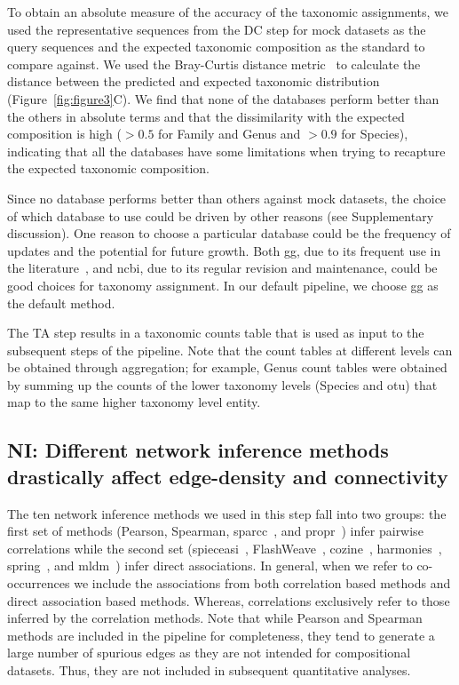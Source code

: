 \documentclass[letterpaper,12pt]{article}
\begin{document}
  To obtain an absolute measure of the accuracy of the taxonomic assignments, we used the representative sequences from the DC step for mock datasets as the query sequences and the expected taxonomic composition as the standard to compare against.
  We used the Bray-Curtis distance metric~\cite{virtanenSciPyFundamentalAlgorithms2020} to calculate the distance between the predicted and expected taxonomic distribution (Figure~\ref{fig:figure3}C).
  We find that none of the databases perform better than the others in absolute terms and that the dissimilarity with the expected composition is high ($>0.5$ for Family and Genus and $>0.9$ for Species), indicating that all the databases have some limitations when trying to recapture the expected taxonomic composition.

  Since no database performs better than others against mock datasets, the choice of which database to use could be driven by other reasons (see Supplementary discussion).
  One reason to choose a particular database could be the frequency of updates and the potential for future growth.
  Both \ac{gg}, due to its frequent use in the literature~\cite{Balvociute2017}, and \ac{ncbi}, due to its regular revision and maintenance, could be good choices for taxonomy assignment.
  In our default pipeline, we choose \ac{gg} as the default method.

  The TA step results in a taxonomic counts table that is used as input to the subsequent steps of the pipeline.
  Note that the count tables at different levels can be obtained through aggregation; for example, Genus count tables were obtained by summing up the counts of the lower taxonomy levels (Species and \ac{otu}) that map to the same higher taxonomy level entity.

  \FloatBarrier

  \subsection*{NI: Different network inference methods drastically affect edge-density and connectivity}

   The ten network inference methods we used in this step fall into two groups: the first set of methods (Pearson, Spearman, \acs{sparcc}~\cite{Friedman2012,Watts2018}, and propr~\cite{quinnProprRpackageIdentifying2017}) infer pairwise correlations while the second set (\acs{spieceasi}~\cite{Kurtz2015}, FlashWeave~\cite{tackmannRapidInferenceDirect2019}, \acs{cozine}~\cite{haCompositionalZeroinflatedNetwork2020a}, \acs{harmonies}~\cite{jiangHARMONIESHybridApproach2020}, \acs{spring}~\cite{yoonMicrobialNetworksSPRING2019}, and \acs{mldm}~\cite{Yang2017}) infer direct associations.
   In general, when we refer to co-occurrences we include the associations from both correlation based methods and direct association based methods.
   Whereas, correlations exclusively refer to those inferred by the correlation methods.
   Note that while Pearson and Spearman methods are included in the pipeline for completeness, they tend to generate a large number of spurious edges as they are not intended for compositional datasets.
   Thus, they are not included in subsequent quantitative analyses.
\end{document}
